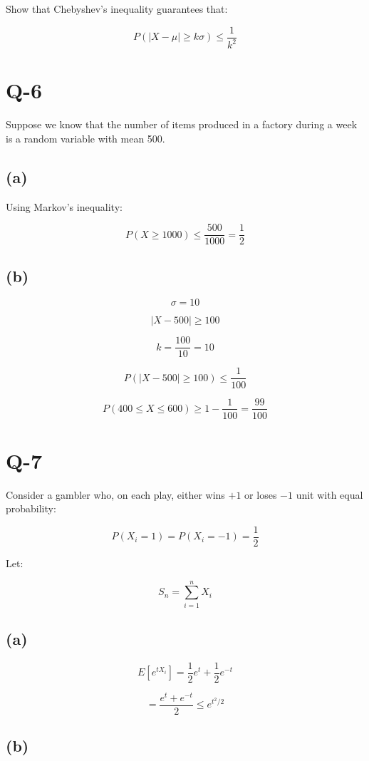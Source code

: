 \documentclass[12pt]{article}
\begin{document}
Show that Chebyshev’s inequality guarantees that:

\[
P(|X - \mu| \ge k\sigma) \le \frac{1}{k^2}
\]

\section*{Q-6}

Suppose we know that the number of items produced in a factory during a week is a random variable with mean 500.

\subsection*{(a)}

Using Markov’s inequality:

\[
P(X \ge 1000) \le \frac{500}{1000} = \frac{1}{2}
\]

\subsection*{(b)}

\[
\sigma = 10
\]

\[
|X - 500| \ge 100
\]

\[
k = \frac{100}{10} = 10
\]

\[
P(|X - 500| \ge 100) \le \frac{1}{100}
\]

\[
P(400 \le X \le 600) \ge 1 - \frac{1}{100} = \frac{99}{100}
\]

\section*{Q-7}

Consider a gambler who, on each play, either wins $+1$ or loses $-1$ unit with equal probability:

\[
P(X_i = 1) = P(X_i = -1) = \frac{1}{2}
\]

Let:

\[
S_n = \sum_{i=1}^{n} X_i
\]

\subsection*{(a)}

\[
E[e^{tX_i}] = \frac{1}{2}e^t + \frac{1}{2}e^{-t}
\]

\[
= \frac{e^t + e^{-t}}{2} \le e^{t^2/2}
\]

\subsection*{(b)}
\end{document}
